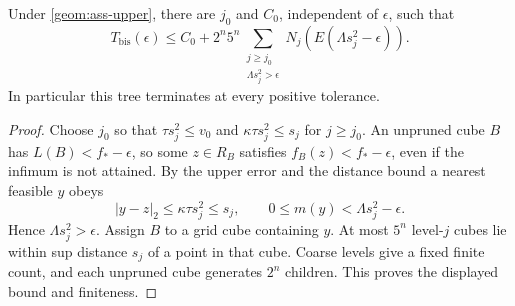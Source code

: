 \begin{lemma}\label{geom:lem-localize}
Under \cref{geom:ass-upper}, there are $j_0$ and $C_0$, independent of
$\epsilon$, such that
\begin{equation}\label{geom:eq-level-sum}
 T_{\mathrm{bis}}(\epsilon)\leq C_0+
   2^n5^n\sum_{\substack{j\geq j_0\\\Lambda s_j^2>\epsilon}}
                 N_j(E(\Lambda s_j^2-\epsilon)).
\end{equation}
In particular this tree terminates at every positive tolerance.
\end{lemma}
\begin{proof}
Choose $j_0$ so that $\tau s_j^2\leq v_0$ and
$\kappa\tau s_j^2\leq s_j$ for $j\geq j_0$. An unpruned cube $B$ has
$L(B)<f_*-\epsilon$, so some $z\in R_B$ satisfies
$f_B(z)<f_*-\epsilon$, even if the infimum is not attained. By the upper
error and the distance bound a nearest feasible $y$ obeys
\[
 |y-z|_2\leq\kappa\tau s_j^2\leq s_j,\qquad
 0\leq m(y)<\Lambda s_j^2-\epsilon.
\]
Hence $\Lambda s_j^2>\epsilon$. Assign $B$ to a grid cube containing
$y$. At most $5^n$ level-$j$ cubes lie within sup distance $s_j$ of a
point in that cube. Coarse levels give a fixed finite count, and each
unpruned cube generates $2^n$ children. This proves the displayed bound
and finiteness.
\end{proof}

